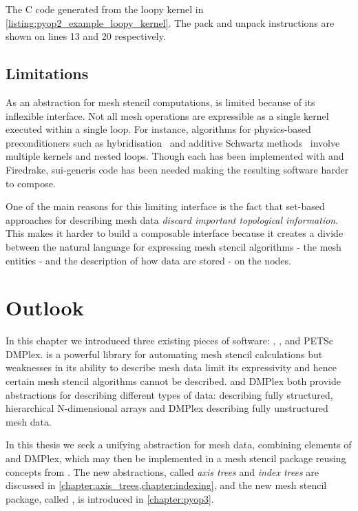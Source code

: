 \documentclass[thesis]{subfiles}
\begin{document}
\begin{listing}
  \centering
  \begin{minipage}{.9\textwidth}
    \inputminted[linenos]{c}{./scripts/artefacts/pyop2_example_c_code_tidy.c}
  \end{minipage}
  \caption{
    The C code generated from the loopy kernel in \cref{listing:pyop2_example_loopy_kernel}.
    The pack and unpack instructions are shown on lines 13 and 20 respectively.
  }
  \label{listing:pyop2_example_c_code}
\end{listing}

\subsection{Limitations}

As an abstraction for mesh stencil computations,  is limited because of its inflexible interface.
Not all mesh operations are expressible as a single kernel executed within a single loop.
For instance, algorithms for physics-based preconditioners such as hybridisation~\cite{gibsonSlateExtendingFiredrake2020} and additive Schwartz methods~\cite{farrellPCPATCHSoftwareTopological2021} involve multiple kernels and nested loops.
Though each has been implemented with  and Firedrake, sui-generis code has been needed making the resulting software harder to compose.

One of the main reasons for this limiting interface is the fact that set-based approaches for describing mesh data \emph{discard important topological information}.
This makes it harder to build a composable interface because it creates a divide between the natural language for expressing mesh stencil algorithms - the mesh entities - and the description of how data are stored - on the nodes.

\section{Outlook}

In this chapter we introduced three existing pieces of software: , \numpy{}, and PETSc DMPlex.
 is a powerful library for automating mesh stencil calculations but weaknesses in its ability to describe mesh data limit its expressivity and hence certain mesh stencil algorithms cannot be described.
\numpy{} and DMPlex both provide abstractions for describing different types of data: \numpy{} describing fully structured, hierarchical N-dimensional arrays and DMPlex describing fully unstructured mesh data.

In this thesis we seek a unifying abstraction for mesh data, combining elements of \numpy{} and DMPlex, which may then be implemented in a mesh stencil package reusing concepts from .
The new abstractions, called \emph{axis trees} and \emph{index trees} are discussed in \cref{chapter:axis_trees,chapter:indexing}, and the new mesh stencil package, called , is introduced in \cref{chapter:pyop3}.
\end{document}
